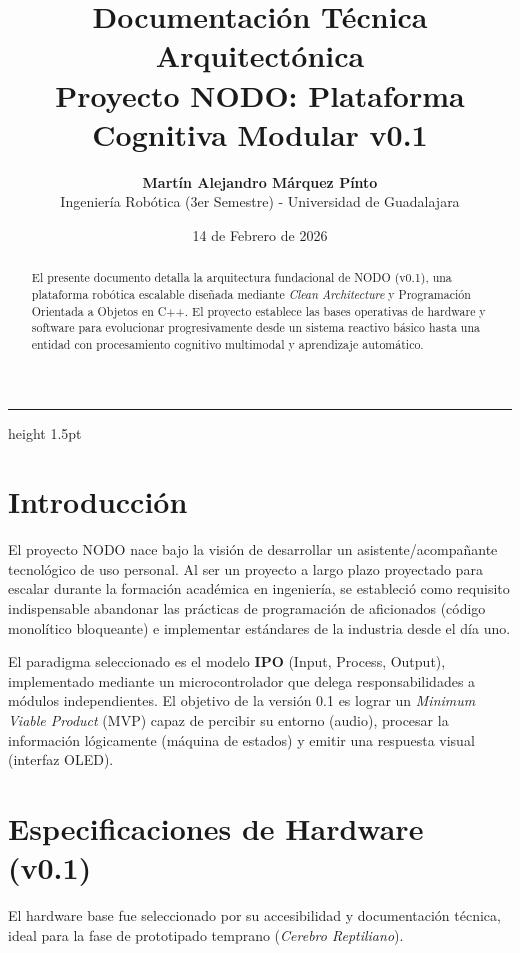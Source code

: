 \documentclass[10pt]{article}
\title{\textbf{Documentación Técnica Arquitectónica}\\Proyecto NODO: Plataforma Cognitiva Modular v0.1}
\author{\textbf{Martín Alejandro Márquez Pínto}\\Ingeniería Robótica (3er Semestre) - Universidad de Guadalajara}
\date{14 de Febrero de 2026}
\begin{document}
\maketitle

\vspace*{\baselineskip}
\hrule height 1.5pt
\vspace*{\baselineskip}

\begin{abstract}
El presente documento detalla la arquitectura fundacional de NODO (v0.1), una plataforma robótica escalable diseñada mediante \textit{Clean Architecture} y Programación Orientada a Objetos en C++. El proyecto establece las bases operativas de hardware y software para evolucionar progresivamente desde un sistema reactivo básico hasta una entidad con procesamiento cognitivo multimodal y aprendizaje automático.
\end{abstract}

\tableofcontents
\thispagestyle{fancy}

\newpage

\section{Introducción}
El proyecto NODO nace bajo la visión de desarrollar un asistente/acompañante tecnológico de uso personal. Al ser un proyecto a largo plazo proyectado para escalar durante la formación académica en ingeniería, se estableció como requisito indispensable abandonar las prácticas de programación de aficionados (código monolítico bloqueante) e implementar estándares de la industria desde el día uno.

El paradigma seleccionado es el modelo \textbf{IPO} (Input, Process, Output), implementado mediante un microcontrolador que delega responsabilidades a módulos independientes. El objetivo de la versión 0.1 es lograr un \textit{Minimum Viable Product} (MVP) capaz de percibir su entorno (audio), procesar la información lógicamente (máquina de estados) y emitir una respuesta visual (interfaz OLED).

\section{Especificaciones de Hardware (v0.1)}
El hardware base fue seleccionado por su accesibilidad y documentación técnica, ideal para la fase de prototipado temprano (\textit{Cerebro Reptiliano}).
\end{document}
